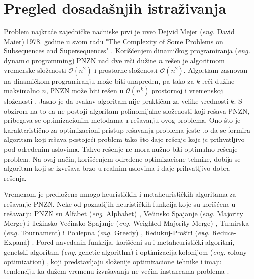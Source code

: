 \documentclass[12pt,oneside]{memoir}
\begin{document}
\section{Pregled dosadašnjih istraživanja}
Problem najkraće zajedničke nadniske prvi je uveo Dejvid Mejer (\textit{eng.} David Maier) 1978. godine u svom radu 
"The Complexity of Some Problems on Subsequences and Supersequences" \cite{Maier}. Korišćenjem dinamičkog
programiranja (\textit{eng.} dynamic programming) PNZN nad dve reči dužine $n$ rešen je algoritmom vremenske 
složenosti $\mathcal{O}(n^{2})$ i prostorne složenosti $\mathcal{O}(n^{2})$. Algortiam zasnovan na dinamičkom programiranju
može biti unapređen, pa tako za $k$ reči dužine maksimalno $n$, PNZN može biti rešen u $\mathcal{O}(n^{k})$ prostornoj i 
vremenskoj složenosti \cite{SCSDinamicProg}. Jasno je da ovakav algoritam nije praktičan za velike vrednosti $k$. S obzirom na to da ne postoji 
algoritam polinomijalne složenosti koji rešava PNZN, pribegava se optimizacionim metodama u rešavanju ovog problema.
Ono što je karakteristično za optimizacioni pristup rešavanju problema jeste to da se formira algoritam koji rešava
postojeći problem tako što daje rešenje koje je prihvatljivo pod određenim uslovima. Takvo rešenje ne mora nužno biti
optimalno rešenje problem. Na ovaj način, korišćenjem određene optimizacione tehnike, dobija se algoritam koji se izvršava
brzo u realnim uslovima i daje prihvatljivo dobra rešenja.

Vremenom je predloženo mnogo heurističkih i metaheurističkih algoritama za rešavanje PNZN.
Neke od poznatijih heurističkih funkcija koje su korišćene u rešavanju PNZN su Alfabet (\textit{eng.} Alphabet) \cite{AlphabetSCS}, Većinsko Spajanje (\textit{eng.} Majority Merge) 
i Težinsko Većinsko Spajanje (\textit{eng.} Weighted Majority Merge) \cite{ProbabilisticBS}, Turnirska (\textit{eng.} Tournament) i Pohlepna (\textit{eng.} Greedy) \cite{Tournament},
Redukuj-Proširi (\textit{eng.} Reduce-Expand) \cite{AlphabetSCS}. Pored navedenih funkcija, korišćeni su i metaheuristički algoritmi, genetski algoritam (\textit{eng.} genetic algorithm) \cite{SCSGenetic} i 
optimizacija kolonijom (\textit{eng.} colony optimization) \cite{SCSColony}, koji predstavljaju složenije optimizacione tehnike i imaju
tendenciju ka dužem vremenu izvršavanja ne većim instancama problema \cite{SCSSBetterSolution}.
\end{document}
